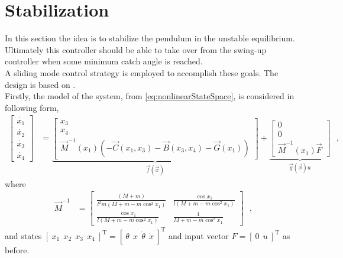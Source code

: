 \chapter{Stabilization}
In this section the idea is to stabilize the pendulum in the unstable equilibrium. Ultimately this controller should be able to take over from the swing-up controller when some minimum catch angle is reached.\\
A sliding mode control strategy is employed to accomplish these goals. The design is based on \cite{HKKhalil}.\\
Firstly, the model of the system, from \autoref{eq:nonlinearStateSpace}, is considered in following form,
\begin{align}
  \begin{bmatrix}
    \dot{x_1} \\
    \dot{x_2} \\
    \dot{x_3} \\
    \dot{x_4}
  \end{bmatrix}
  &=
  \underbrace{
    \begin{bmatrix}
      x_3 \\
      x_4 \\
      \vec{M}^{-1}(x_1) ( - \vec{C}(x_1,x_3) - \vec{B}(x_3,x_4) - \vec{G}(x_1) )
    \end{bmatrix}
  }_{\vec{f}(\vec{x})}
  +
  \underbrace{ 
    \begin{bmatrix}
      0 \\
      0 \\
      \vec{M}^{-1}(x_1) \vec{F} 
    \end{bmatrix}
  }_{\vec{g}(\vec{x}) u}
  \label{eq:nonlinearStateSpace2} \ \ \ ,
\end{align}
where
\begin{align}
  \vec{M}^{-1}
  &=
  \begin{bmatrix}
    \frac{(M + m)}{l^2 m ( M + m - m \cos^2 x_1 )}  &  \frac{\cos x_1}{l (M + m - m \cos^2 x_1)} \\
    \frac{\cos x_1}{l (M + m - m \cos^2 x_1)}       &  \frac{1}{M + m - m \cos^2 x_1}
  \end{bmatrix}  \ \ \ ,
\end{align}
%
and states $ [\ x_1\ \ x_2\ \ x_3\ \ x_4\ ]^\mathrm{T} = [\ \theta\ \ x\ \ \dot{\theta}\ \ \dot{x}\ ]^\mathrm{T} $ and input vector $F = [\ 0 \ \ u \ ]^\mathrm{T}$ as before.


